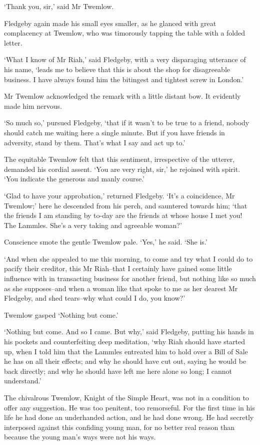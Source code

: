 ‘Thank you, sir,’ said Mr Twemlow.

Fledgeby again made his small eyes smaller, as he glanced with great
complacency at Twemlow, who was timorously tapping the table with a
folded letter.

‘What I know of Mr Riah,’ said Fledgeby, with a very disparaging
utterance of his name, ‘leads me to believe that this is about the shop
for disagreeable business. I have always found him the bitingest and
tightest screw in London.’

Mr Twemlow acknowledged the remark with a little distant bow. It
evidently made him nervous.

‘So much so,’ pursued Fledgeby, ‘that if it wasn’t to be true to a
friend, nobody should catch me waiting here a single minute. But if you
have friends in adversity, stand by them. That’s what I say and act up
to.’

The equitable Twemlow felt that this sentiment, irrespective of the
utterer, demanded his cordial assent. ‘You are very right, sir,’ he
rejoined with spirit. ‘You indicate the generous and manly course.’

‘Glad to have your approbation,’ returned Fledgeby. ‘It’s a coincidence,
Mr Twemlow;’ here he descended from his perch, and sauntered towards
him; ‘that the friends I am standing by to-day are the friends at whose
house I met you! The Lammles. She’s a very taking and agreeable woman?’

Conscience smote the gentle Twemlow pale. ‘Yes,’ he said. ‘She is.’

‘And when she appealed to me this morning, to come and try what I could
do to pacify their creditor, this Mr Riah--that I certainly have gained
some little influence with in transacting business for another friend,
but nothing like so much as she supposes--and when a woman like that
spoke to me as her dearest Mr Fledgeby, and shed tears--why what could I
do, you know?’

Twemlow gasped ‘Nothing but come.’

‘Nothing but come. And so I came. But why,’ said Fledgeby, putting
his hands in his pockets and counterfeiting deep meditation, ‘why Riah
should have started up, when I told him that the Lammles entreated him
to hold over a Bill of Sale he has on all their effects; and why he
should have cut out, saying he would be back directly; and why he should
have left me here alone so long; I cannot understand.’

The chivalrous Twemlow, Knight of the Simple Heart, was not in a
condition to offer any suggestion. He was too penitent, too remorseful.
For the first time in his life he had done an underhanded action, and he
had done wrong. He had secretly interposed against this confiding young
man, for no better real reason than because the young man’s ways were
not his ways.

